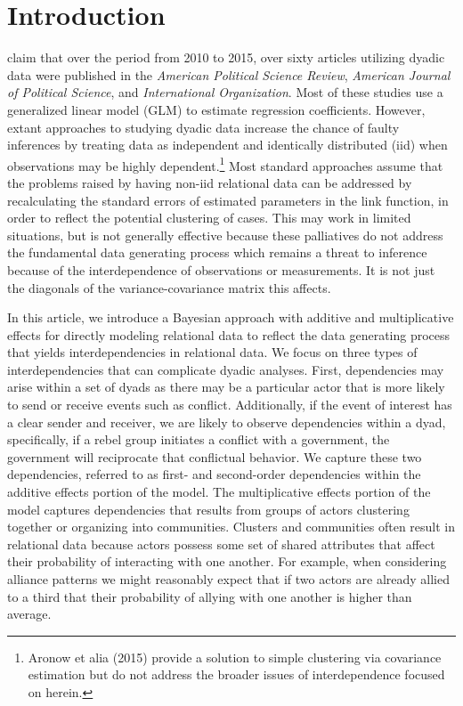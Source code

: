 \section{\textbf{Introduction}}

\citet{aronow:etal:2015} claim that over the period from 2010 to 2015, over sixty articles utilizing dyadic data were published in the \textit{American Political Science Review}, \textit{American Journal of Political Science}, and \textit{International Organization}. Most of these studies  use a generalized linear model (GLM) to estimate regression coefficients.  However, extant approaches to studying dyadic data increase the chance of faulty inferences by treating data as independent and identically distributed (iid) when observations may be highly dependent.\footnote{Aronow et alia (2015) provide a solution to simple clustering via covariance estimation but do not address the broader issues of interdependence focused on herein.} Most standard approaches assume that the problems raised by having non-iid relational data can be addressed by recalculating the standard errors of estimated parameters in the link function, in order to reflect the potential clustering of cases. This may work in limited situations, but is not generally effective because these palliatives do not address the fundamental data generating process which remains a threat to inference because of the interdependence of observations or measurements. It is not just the diagonals of the variance-covariance matrix this affects.

In this article, we introduce a Bayesian approach with additive and multiplicative effects for directly modeling relational data to reflect the data generating process that yields interdependencies in relational data. We focus on three types of interdependencies that can complicate dyadic analyses. First, dependencies may arise within a set of dyads as there may be a particular actor that is more likely to send or receive events such as conflict. Additionally, if the event of interest has a clear sender and receiver, we are likely to observe dependencies within a dyad, specifically, if a rebel group initiates a conflict with a government, the government will reciprocate that conflictual behavior. We capture these two dependencies, referred to as first- and second-order dependencies within the additive effects portion of the model. The multiplicative effects portion of the model captures dependencies that results from groups of actors clustering together or organizing into communities. Clusters and communities often result in relational data because actors possess some set of shared attributes that affect their probability of interacting with one another. For example, when considering alliance patterns we might reasonably expect that if two actors are already allied to a third that their probability of allying with one another is higher than average. 

